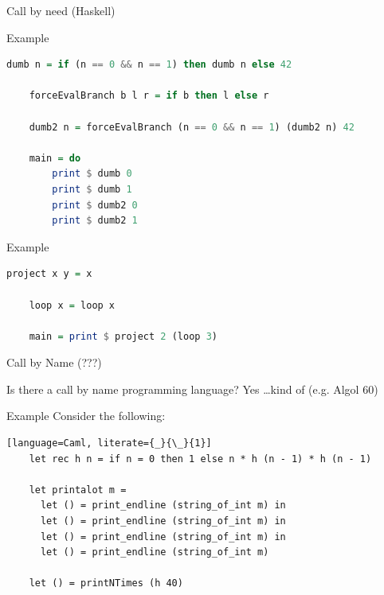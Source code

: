 \documentclass[10pt]{beamer}
\begin{document}
\begin{frame}[fragile]{Call by need (Haskell)}
  \begin{alertblock}{Example}
  \begin{lstlisting}[language=Haskell]
    dumb n = if (n == 0 && n == 1) then dumb n else 42

    forceEvalBranch b l r = if b then l else r

    dumb2 n = forceEvalBranch (n == 0 && n == 1) (dumb2 n) 42

    main = do
        print $ dumb 0
        print $ dumb 1
        print $ dumb2 0
        print $ dumb2 1

  \end{lstlisting}
  \end{alertblock}

  \pause

  \begin{alertblock}{Example}
  \begin{lstlisting}[language=Haskell]
    project x y = x

    loop x = loop x

    main = print $ project 2 (loop 3)
  \end{lstlisting}
  \end{alertblock}


\end{frame}

\begin{frame}[fragile]{Call by Name (???)}
  \begin{alertblock}{Is there a call by name programming language?}
    Yes \dots kind of (e.g. Algol 60)
  \end{alertblock}

  \begin{alertblock}{Example}
    Consider the following:
  \begin{lstlisting}[language=Caml, literate={_}{\_}{1}]
    let rec h n = if n = 0 then 1 else n * h (n - 1) * h (n - 1)

    let printalot m =
      let () = print_endline (string_of_int m) in
      let () = print_endline (string_of_int m) in
      let () = print_endline (string_of_int m) in
      let () = print_endline (string_of_int m)

    let () = printNTimes (h 40)

  \end{lstlisting}
  \end{alertblock}
\end{frame}
\end{document}
